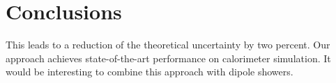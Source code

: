 \section{Conclusions}\label{sec:conclusions}

This leads to a reduction of the theoretical uncertainty by two percent.
Our approach achieves state-of-the-art performance on calorimeter
simulation. It would be interesting to combine this approach with dipole
showers.

